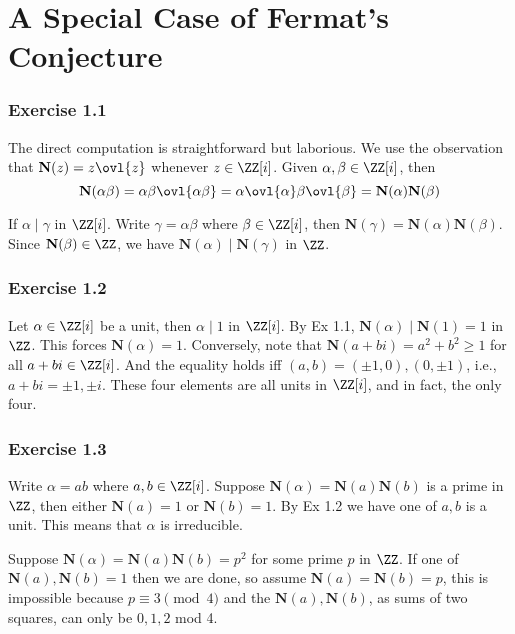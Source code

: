 \documentclass[../Chapter.tex]{subfiles}
\begin{document}
\chapter{A Special Case of Fermat's Conjecture}

\subsection*{Exercise 1.1}

The direct computation is straightforward but laborious. We use the observation that $\mathbf{N}(z)=z\ovl{z}$ whenever $z\in\ZZ[i]$. Given $\alpha,\beta\in\ZZ[i]$, then $$\mathbf{N}(\alpha\beta)=\alpha\beta\ovl{\alpha\beta}=\alpha\ovl{\alpha}\beta\ovl{\beta}=\mathbf{N}(\alpha)\mathbf{N}(\beta)$$

If $\alpha\mid\gamma$ in $\ZZ[i]$. Write $\gamma=\alpha\beta$ where $\beta\in\ZZ[i]$, then $\mathbf{N}(\gamma)=\mathbf{N}(\alpha)\mathbf{N}(\beta)$. Since $\mathbf{N}(\beta)\in\ZZ$, we have $\mathbf{N}(\alpha)\mid\mathbf{N}(\gamma)$ in $\ZZ$.

\subsection*{Exercise 1.2}

Let $\alpha\in\ZZ[i]$ be a unit, then $\alpha\mid 1$ in $\ZZ[i]$. By Ex 1.1, $\mathbf{N}(\alpha)\mid \mathbf{N}(1)=1$ in $\ZZ$. This forces $\mathbf{N}(\alpha)=1$. Conversely, note that $\mathbf{N}(a+bi)=a^2+b^2\geq 1$ for all $a+bi\in\ZZ[i]$. And the equality holds iff $(a,b)=(\pm1,0),(0,\pm1)$, i.e., $a+bi=\pm1,\pm i$. These four elements are all units in $\ZZ[i]$, and in fact, the only four.

\subsection*{Exercise 1.3}

Write $\alpha=ab$ where $a,b\in\ZZ[i]$. Suppose $\mathbf{N}(\alpha)=\mathbf{N}(a)\mathbf{N}(b)$ is a prime in $\ZZ$, then either $\mathbf{N}(a)=1$ or $\mathbf{N}(b)=1$. By Ex 1.2 we have one of $a,b$ is a unit. This means that $\alpha$ is irreducible.

Suppose $\mathbf{N}(\alpha)=\mathbf{N}(a)\mathbf{N}(b)=p^2$ for some prime $p$ in $\ZZ$. If one of $\mathbf{N}(a),\mathbf{N}(b)=1$ then we are done, so assume $\mathbf{N}(a)=\mathbf{N}(b)=p$, this is impossible because $p\equiv 3\pmod{4}$ and the $\mathbf{N}(a),\mathbf{N}(b)$, as sums of two squares, can only be $0,1,2$ mod 4.
\end{document}
